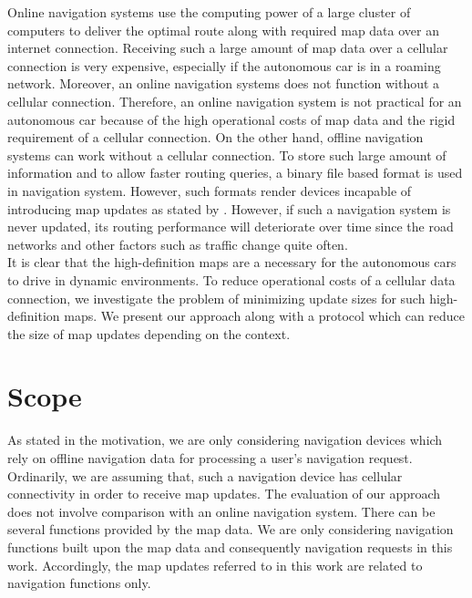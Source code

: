 Online navigation systems use the computing power of a large cluster of computers to deliver the optimal route along with required map data over an internet connection. Receiving such a large amount of map data over a cellular connection is very expensive, especially if the autonomous car is in a roaming network. Moreover, an online navigation systems does not function without a cellular connection. Therefore, an online navigation system is not practical for an autonomous car because of the high operational costs of map data and the rigid requirement of a cellular connection. On the other hand, offline navigation systems can work without a cellular connection. To store such large amount of information and to allow faster routing queries, a binary file based format is used in navigation system. However, such formats render devices incapable of introducing map updates as stated by \citet{min2008mobile}. However, if such a navigation system is never updated, its routing performance will deteriorate over time since the road networks and other factors such as traffic change quite often. \\

It is clear that the high-definition maps are a necessary for the autonomous cars to drive in dynamic environments. To reduce operational costs of a cellular data connection, we investigate the problem of minimizing update sizes for such high-definition maps. We present our approach along with a protocol which can reduce the size of map updates depending on the context. \\

\section{Scope} \label{scope}
As stated in the motivation, we are only considering navigation devices which rely on offline navigation data for processing a user's navigation request. Ordinarily, we are assuming that, such a navigation device has cellular connectivity in order to receive map updates. The evaluation of our approach does not involve comparison with an online navigation system. There can be several functions provided by the map data. We are only considering navigation functions built upon the map data and consequently navigation requests in this work. Accordingly, the map updates referred to in this work are related to navigation functions only.

